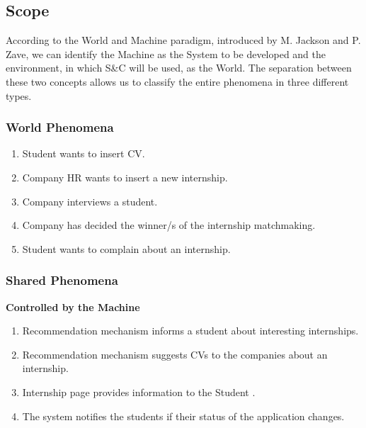 \documentclass{article}
\begin{document}
\subsection{Scope}
According to the World and Machine paradigm, introduced by M. Jackson and P.
Zave, we can identify the Machine as the System to be developed and the
environment, in which S\&C will be used, as the World. The separation between
these two concepts allows us to classify the entire phenomena in three different
types.
\subsubsection{World Phenomena}

\begin{enumerate}[label=WP\arabic*.]
    \item Student wants to insert CV.
    \item Company HR wants to insert a new internship.
    \item Company interviews a student.
    \item Company has decided the winner/s of the internship matchmaking.
    \item Student wants to complain about an internship.
\end{enumerate}


\subsubsection{Shared Phenomena}

\begin{flushleft}
    \textbf{Controlled by the Machine}
\end{flushleft}
\begin{enumerate}[label=SPM\arabic*.]
    \item Recommendation mechanism informs a student about interesting internships.
    \item Recommendation mechanism suggests CVs to the companies about an internship.
    \item Internship page provides information to the Student .
    \item The system notifies the students if their status of the application changes.
\end{enumerate}
\end{document}
